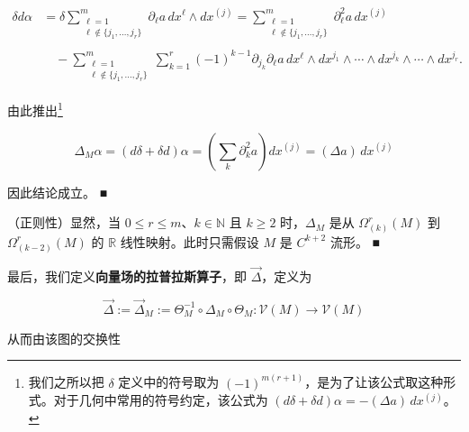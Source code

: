 \begin{remark}
\begin{items}
\begin{equation*}
\begin{aligned}
\delta d\alpha &= \delta\sum_{\substack{\ell=1\\ \ell\notin\{j_{1},\ldots,j_{r}\}}}^{m}\partial_{\ell}a\, dx^{\ell}\wedge dx^{(j)} = \sum_{\substack{\ell=1\\ \ell\notin\{j_{1},\ldots,j_{r}\}}}^{m}\partial_{\ell}^{2}a\, dx^{(j)} \\ &\quad - \sum_{\substack{\ell=1\\ \ell\notin\{j_{1},\ldots,j_{r}\}}}^{m}\sum_{k=1}^{r}(-1)^{k-1}\partial_{j_{k}}\partial_{\ell}a\, dx^{\ell}\wedge dx^{j_{1}}\wedge\cdots\wedge\widehat{dx^{j_{k}}}\wedge\cdots\wedge dx^{j_{r}} .
\end{aligned}
\end{equation*}

由此推出\footnote{我们之所以把 $ \delta $ 定义中的符号取为 $ (-1)^{m(r+1)} $，是为了让该公式取这种形式。对于几何中常用的符号约定，该公式为 $ (d\delta+\delta d)\alpha = -(\Delta a)\, dx^{(j)} $。}

\[
\Delta_{M}\alpha = (d\delta + \delta d)\alpha = \left(\sum_{k}\partial_{k}^{2}a\right) dx^{(j)} = (\Delta a)\, dx^{(j)}
\]

因此结论成立。 \nobreak\hspace{0.35em}■

\item

（正则性）显然，当 $ 0 \le r \le m $、$ k \in \mathbb{N} $ 且 $ k \ge 2 $ 时，$ \Delta_{M} $ 是从 $ \Omega^{r}_{(k)}(M) $ 到 $ \Omega^{r}_{(k-2)}(M) $ 的 $ \mathbb{R} $ 线性映射。此时只需假设 $ M $ 是 $ C^{k+2} $ 流形。 \nobreak\hspace{0.35em}■

\end{items}

最后，我们定义\textbf{向量场的拉普拉斯算子}，即 $ \vec{\Delta} $，定义为

\[
\vec{\Delta} := \vec{\Delta}_{M} := \Theta_{M}^{-1}\circ\Delta_{M}\circ\Theta_{M} : \mathcal{V}(M) \to \mathcal{V}(M)
\]

从而由该图的交换性

\end{remark}

